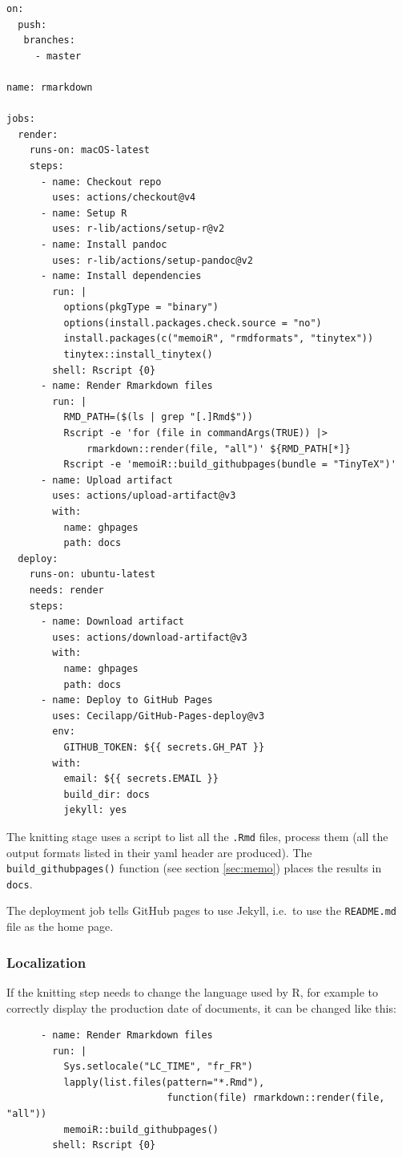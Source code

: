 \documentclass[
  12pt,
  american,
  a4paper,
  extrafontsizes,onecolumn,openright
  ]{memoir}
\begin{document}
\begin{verbatim}
on:
  push:
   branches:
     - master

name: rmarkdown

jobs:
  render:
    runs-on: macOS-latest
    steps:
      - name: Checkout repo
        uses: actions/checkout@v4
      - name: Setup R
        uses: r-lib/actions/setup-r@v2
      - name: Install pandoc
        uses: r-lib/actions/setup-pandoc@v2
      - name: Install dependencies
        run: |
          options(pkgType = "binary")
          options(install.packages.check.source = "no")
          install.packages(c("memoiR", "rmdformats", "tinytex"))
          tinytex::install_tinytex()
        shell: Rscript {0}
      - name: Render Rmarkdown files
        run: |
          RMD_PATH=($(ls | grep "[.]Rmd$"))
          Rscript -e 'for (file in commandArgs(TRUE)) |>
              rmarkdown::render(file, "all")' ${RMD_PATH[*]}
          Rscript -e 'memoiR::build_githubpages(bundle = "TinyTeX")'
      - name: Upload artifact
        uses: actions/upload-artifact@v3
        with:
          name: ghpages
          path: docs
  deploy:
    runs-on: ubuntu-latest
    needs: render
    steps:
      - name: Download artifact
        uses: actions/download-artifact@v3
        with:
          name: ghpages
          path: docs
      - name: Deploy to GitHub Pages
        uses: Cecilapp/GitHub-Pages-deploy@v3
        env:
          GITHUB_TOKEN: ${{ secrets.GH_PAT }}
        with:
          email: ${{ secrets.EMAIL }}
          build_dir: docs
          jekyll: yes
\end{verbatim}

The knitting stage uses a script to list all the \texttt{.Rmd} files, process them (all the output formats listed in their yaml header are produced).
The \texttt{build\_githubpages()} function (see section \ref{sec:memo}) places the results in \texttt{docs}.

The deployment job tells GitHub pages to use Jekyll, i.e.~to use the \texttt{README.md} file as the home page.

\hypertarget{localization}{%
\subsubsection{Localization}\label{localization}}

If the knitting step needs to change the language used by R, for example to correctly display the production date of documents, it can be changed like this:

\begin{verbatim}
      - name: Render Rmarkdown files
        run: |
          Sys.setlocale("LC_TIME", "fr_FR")
          lapply(list.files(pattern="*.Rmd"), 
                            function(file) rmarkdown::render(file, "all"))
          memoiR::build_githubpages()
        shell: Rscript {0}
\end{verbatim}
\end{document}
